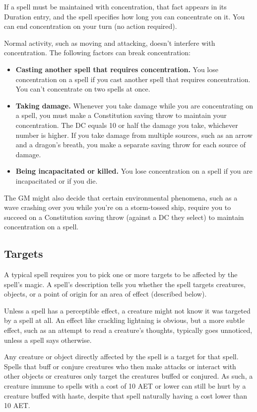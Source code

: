 If a spell must be maintained with concentration, that fact appears in its Duration entry, and the spell specifies how long you can concentrate on it. You can end concentration on your turn (no action required).

Normal activity, such as moving and attacking, doesn't interfere with concentration. The following factors can break concentration:

\begin{itemize}
    \item \textbf{Casting another spell that requires concentration.} You lose concentration on a spell if you cast another spell that requires concentration. You can't concentrate on two spells at once.
    \item \textbf{Taking damage.} Whenever you take damage while you are concentrating on a spell, you must make a Constitution saving throw to maintain your concentration. The DC equals 10 or half the damage you take, whichever number is higher. If you take damage from multiple sources, such as an arrow and a dragon's breath, you make a separate saving throw for each source of damage.
    \item \textbf{Being incapacitated or killed.} You lose concentration on a spell if you are incapacitated or if you die.
\end{itemize}

The GM might also decide that certain environmental phenomena, such as a wave crashing over you while you're on a storm-tossed ship, require you to succeed on a Constitution saving throw (against a DC they select) to maintain concentration on a spell.

\subsection{Targets}

A typical spell requires you to pick one or more targets to be affected by the spell's magic. A spell's description tells you whether the spell targets creatures, objects, or a point of origin for an area of effect (described below).

Unless a spell has a perceptible effect, a creature might not know it was targeted by a spell at all. An effect like crackling lightning is obvious, but a more subtle effect, such as an attempt to read a creature's thoughts, typically goes unnoticed, unless a spell says otherwise.

Any creature or object directly affected by the spell is a target for that spell. Spells that buff or conjure creatures who then make attacks or interact with other objects or creatures only target the creatures buffed or conjured. As such, a creature immune to spells with a cost of 10 AET or lower can still be hurt by a creature buffed with haste, despite that spell naturally having a cost lower than 10 AET.

